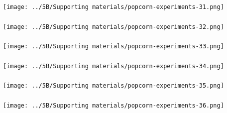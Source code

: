 \begin{frame}\frametitle{}
	\centerline{\texttt{[image: ../5B/Supporting materials/popcorn-experiments-31.png]}}
\end{frame}
\begin{frame}\frametitle{}
	\centerline{\texttt{[image: ../5B/Supporting materials/popcorn-experiments-32.png]}}
\end{frame}
\begin{frame}\frametitle{}
	\centerline{\texttt{[image: ../5B/Supporting materials/popcorn-experiments-33.png]}}
\end{frame}
\begin{frame}\frametitle{}
	\centerline{\texttt{[image: ../5B/Supporting materials/popcorn-experiments-34.png]}}
\end{frame}
\begin{frame}\frametitle{}
	\centerline{\texttt{[image: ../5B/Supporting materials/popcorn-experiments-35.png]}}
\end{frame}
\begin{frame}\frametitle{}
	\centerline{\texttt{[image: ../5B/Supporting materials/popcorn-experiments-36.png]}}
\end{frame}
